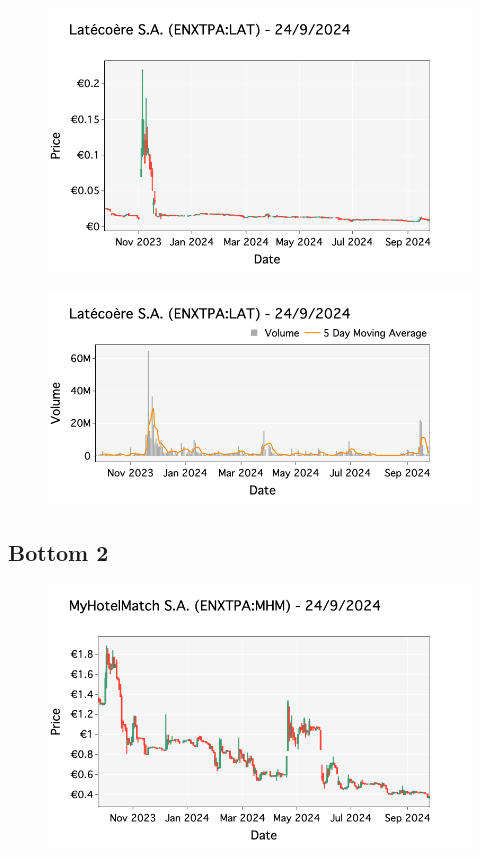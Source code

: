 \documentclass[a4paper, twocolumn, 11pt, paperequity]{gorgona}
\begin{document}
\begin{figure}[H]
    \centering
    \includegraphics[width=\columnwidth]{France/images/Bottom_Returns/Bottom_1_candlestick.png}
\end{figure}

\begin{figure}[H]
    \centering
    \includegraphics[width=\columnwidth]{France/images/Bottom_Returns/Bottom_1_volume.png}
\end{figure}

\subsection*{Bottom 2}

\begin{figure}[H]
    \centering
    \includegraphics[width=\columnwidth]{France/images/Bottom_Returns/Bottom_2_candlestick.png}
\end{figure}
\end{document}
